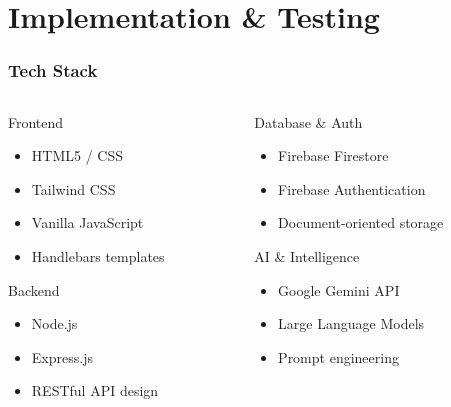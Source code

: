 \documentclass{beamer}
\begin{document}
\section{Implementation \& Testing}
\begin{frame}
  \frametitle{Tech Stack}
  
  \begin{columns}
    \begin{column}{0.5\textwidth}
      \begin{block}{\textcolor{rxwhite}{Frontend}}
        \begin{itemize}
          \item HTML5 / CSS
          \item Tailwind CSS
          \item Vanilla JavaScript
          \item Handlebars templates
        \end{itemize}
      \end{block}
      
      \begin{block}{\textcolor{rxwhite}{Backend}}
        \begin{itemize}
          \item Node.js
          \item Express.js
          \item RESTful API design
        \end{itemize}
      \end{block}
    \end{column}
    
    \begin{column}{0.5\textwidth}
      \begin{block}{\textcolor{rxwhite}{Database \& Auth}}
        \begin{itemize}
          \item Firebase Firestore
          \item Firebase Authentication
          \item Document-oriented storage
        \end{itemize}
      \end{block}
      
      \begin{block}{\textcolor{rxwhite}{AI \& Intelligence}}
        \begin{itemize}
          \item Google Gemini API
          \item Large Language Models
          \item Prompt engineering
        \end{itemize}
      \end{block}
    \end{column}
  \end{columns}
\end{frame}
\end{document}

